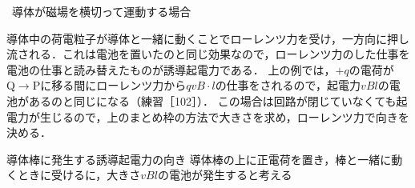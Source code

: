 \noindent{}\ {\gtfamily 導体が磁場を横切って運動する場合}

導体中の荷電粒子が導体と一緒に動くことでローレンツ力を受け，一方向に押し流される．これは電池を置いたのと同じ効果なので，ローレンツ力のした仕事を電池の仕事と読み替えたものが誘導起電力である．
上の例では，$+q$の電荷が$\mathrm{Q}\to\mathrm{P}$に移る間にローレンツ力から$qvB\cdot l$の仕事をされるので，起電力$vBl$の電池があるのと同じになる（練習［102］）．
この場合は回路が閉じていなくても起電力が生じるので，上のまとめ枠の方法で大きさを求め，ローレンツ力で向きを決める．

\bsNeed{26mm}
\begin{matome}{導体棒に発生する誘導起電力の向き}
 \hspace{3mm} 導体棒の上に正電荷を置き，棒と一緒に動くときに受けるに，大きさ$vBl$の電池が発生すると考える
\end{matome}

